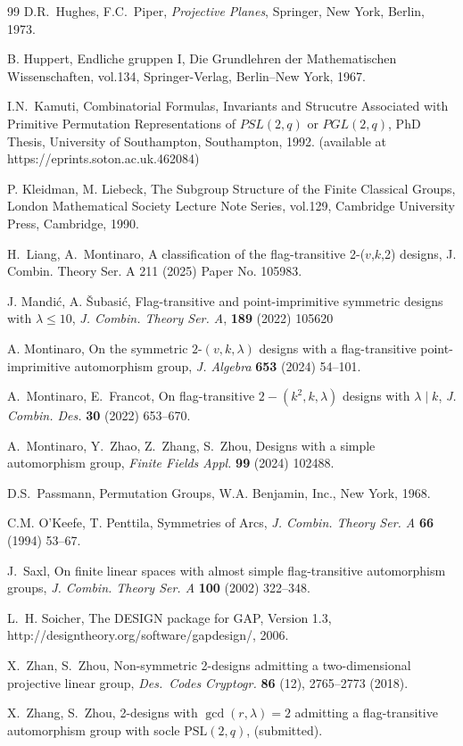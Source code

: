 \documentclass[a4paper,twopage,reqno,12pt]{amsart}
\theoremstyle{definition}
\numberwithin{equation}{section}
\newcommand{\PSL}{\mathrm{PSL}}
\renewcommand{\leq}{\leqslant}
\begin{document}
\begin{thebibliography}{99}
 D.R.~Hughes, F.C.~Piper, \emph{Projective Planes}, Springer, New
York, Berlin, 1973.

B. Huppert, Endliche gruppen I, Die Grundlehren der
Mathematischen Wissenschaften, vol.134, Springer-Verlag, Berlin--New York, 1967.

I.N.~Kamuti, Combinatorial Formulas, Invariants and Strucutre Associated with Primitive Permutation Representations of $PSL(2,q)$ or $PGL(2,q)$, PhD Thesis, University of Southampton, Southampton, 1992. (available at https://eprints.soton.ac.uk.462084)

 P. Kleidman, M. Liebeck, The Subgroup Structure of the Finite
Classical Groups, London Mathematical Society Lecture Note Series, vol.129,
Cambridge University Press, Cambridge, 1990. 

 H.~Liang, A.~Montinaro, A classification of the flag-transitive
  2-({$v$},{$k$},2) designs, J. Combin. Theory Ser. A 211 (2025) Paper No.
  105983.

 J. Mandi\'{c}, A. \v{S}ubasi\'{c}, Flag-transitive and
point-imprimitive symmetric designs with $\lambda \leq 10$, \emph{J. Combin. Theory
Ser. A}, \textbf{189} (2022) 105620

 A. Montinaro, On the symmetric $2$-$(v,k,\lambda)$ designs with a flag-transitive point-imprimitive automorphism group, \emph{J. Algebra} \textbf{653} (2024) 54--101.

 A.~Montinaro, E.~Francot, On flag-transitive $2-(k^{2},k,\lambda)$ designs with $\lambda \mid k$, \emph{J. Combin. Des.} \textbf{30} (2022) 653–670.

 A.~Montinaro, Y.~Zhao, Z.~Zhang, S.~Zhou, Designs with a simple automorphism group, 
\emph{Finite Fields Appl.} \textbf{99} (2024) 102488. 

 D.S.~Passmann, Permutation Groups, W.A. Benjamin, Inc., New
York, 1968.

 C.M. O'Keefe, T. Penttila, Symmetries of Arcs, \emph{J. Combin. Theory Ser. A} \textbf{66} (1994) 53--67.


 J.~Saxl, On finite linear spaces with almost simple flag-transitive automorphism groups, \emph{J. Combin. Theory Ser. A} \textbf{100} (2002) 322--348.

  L.~H. Soicher, The DESIGN package for GAP, Version 1.3, http://designtheory.org/software/gapdesign/, 2006.

 X.~Zhan, S.~Zhou, Non-symmetric 2-designs admitting a two-dimensional projective
linear group, \emph{Des.\ Codes Cryptogr.} \textbf{86} (12), 2765–2773 (2018).

 X.~Zhang, S.~Zhou, 2-designs with $\gcd(r,\lambda)=2$ admitting a flag-transitive automorphism group with socle $\PSL(2,q)$, (submitted).

\end{thebibliography}
\end{document}
